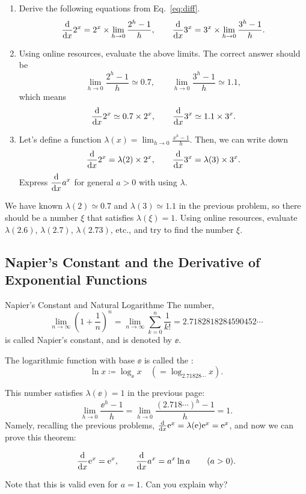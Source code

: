 \documentclass[11pt,pdfa,lastpage]{MishoNote}
\begin{document}
\ornamentskip

\begin{enumerate}[resume]
 \itemB
 \begin{enumerate}
  \item Derive the following equations from Eq.~\eqref{eq:diff}.
\[
  \diff{}{x}2^x = 2^x\times\lim_{h\to 0}\frac{2^h-1}{h},\qquad
  \diff{}{x}3^x = 3^x\times\lim_{h\to 0}\frac{3^h-1}{h}.
\]
\item Using online resources, evaluate the above limits. The correct answer should be
\[
  \lim_{h\to 0}\frac{2^h-1}{h}\simeq0.7, \qquad \lim_{h\to 0}\frac{3^h-1}{h}\simeq1.1,
\]
which means
\[
  \diff{}{x}2^x \simeq 0.7\times2^x,\qquad
  \diff{}{x}3^x \simeq 1.1\times3^x.
\]
\item Let's define a function $\displaystyle\lambda(x)=\lim_{h\to 0}\frac{x^h-1}{h}$. Then, we can write down
\[
  \diff{}{x}2^x = \lambda(2)\times2^x,\qquad
  \diff{}{x}3^x = \lambda(3)\times3^x.
\]
Express $\displaystyle\diff{}{x}a^x$ for general $a>0$ with using $\lambda$.
\end{enumerate}
\itemC We have known $\lambda(2)\simeq 0.7$ and $\lambda(3)\simeq 1.1$ in the previous problem, so there should be a number $\xi$ that satisfies $\lambda(\xi)=1$.
Using online resources, evaluate $\lambda(2.6)$, $\lambda(2.7)$, $\lambda(2.73)$, etc., and try to find the number $\xi$.
\end{enumerate}

\newpage
\subsection{Napier's Constant and the Derivative of Exponential Functions}
\begin{definition}{Napier's Constant and Natural Logarithm}{e}
The number,
\begin{equation}
  \lim_{n\to\infty}\left(1+\frac{1}n\right)^n=\lim_{n\to\infty}\sum_{k=0}^n\frac{1}{k!}=2.7182818284590452\cdots\label{eq:napier}
\end{equation}
is called Napier's constant, and is denoted by $\ee$.

The logarithmic function with base $\ee$ is called the :
\[
  \ln x \coloneq \log_{\ee} x \quad(=\log_{2.71828\cdots}x).
\]
\end{definition}
This number satisfies $\lambda(\ee)=1$ in the previous page:
\[
  \lim_{h\to 0}\frac{\ee^h-1}{h}= \lim_{h\to 0}\frac{(2.718\cdots)^h-1}{h}=1.
\]
Namely, recalling the previous problems,
$ \diff{}{x}\ee^x=\lambda(\ee)\ee^x=\ee^x$, and now
we can prove this theorem:
\begin{theorem}{}{}
  \begin{equation}
      \diff{}x{\ee^x}=\ee^x,\qquad
      \diff{}x{a^x}=a^x\ln a\qquad(a>0).
  \end{equation}
\end{theorem}
Note that this is valid even for $a=1$. Can you explain why? 
\end{document}
